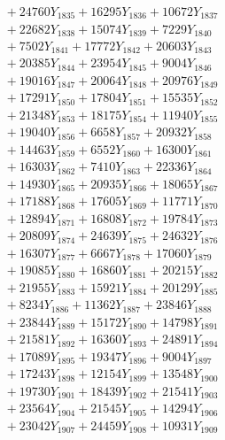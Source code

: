 \documentclass[a4paper,10pt]{article}
\begin{document}
{\begin{align}
&\;  + 24760 Y_{1835} + 16295 Y_{1836} + 10672 Y_{1837} \\[0.3ex]
&\;  + 22682 Y_{1838} + 15074 Y_{1839} + 7229 Y_{1840} \\[0.3ex]
&\;  + 7502 Y_{1841} + 17772 Y_{1842} + 20603 Y_{1843} \\[0.3ex]
&\;  + 20385 Y_{1844} + 23954 Y_{1845} + 9004 Y_{1846} \\[0.3ex]
&\;  + 19016 Y_{1847} + 20064 Y_{1848} + 20976 Y_{1849} \\[0.3ex]
&\;  + 17291 Y_{1850} + 17804 Y_{1851} + 15535 Y_{1852} \\[0.3ex]
&\;  + 21348 Y_{1853} + 18175 Y_{1854} + 11940 Y_{1855} \\[0.3ex]
&\;  + 19040 Y_{1856} + 6658 Y_{1857} + 20932 Y_{1858} \\[0.5ex]\allowbreak
&\;  + 14463 Y_{1859} + 6552 Y_{1860} + 16300 Y_{1861} \\[0.3ex]
&\;  + 16303 Y_{1862} + 7410 Y_{1863} + 22336 Y_{1864} \\[0.3ex]
&\;  + 14930 Y_{1865} + 20935 Y_{1866} + 18065 Y_{1867} \\[0.3ex]
&\;  + 17188 Y_{1868} + 17605 Y_{1869} + 11771 Y_{1870} \\[0.3ex]
&\;  + 12894 Y_{1871} + 16808 Y_{1872} + 19784 Y_{1873} \\[0.3ex]
&\;  + 20809 Y_{1874} + 24639 Y_{1875} + 24632 Y_{1876} \\[0.3ex]
&\;  + 16307 Y_{1877} + 6667 Y_{1878} + 17060 Y_{1879} \\[0.3ex]
&\;  + 19085 Y_{1880} + 16860 Y_{1881} + 20215 Y_{1882} \\[0.3ex]
&\;  + 21955 Y_{1883} + 15921 Y_{1884} + 20129 Y_{1885} \\[0.3ex]
&\;  + 8234 Y_{1886} + 11362 Y_{1887} + 23846 Y_{1888} \\[0.5ex]\allowbreak
&\;  + 23844 Y_{1889} + 15172 Y_{1890} + 14798 Y_{1891} \\[0.3ex]
&\;  + 21581 Y_{1892} + 16360 Y_{1893} + 24891 Y_{1894} \\[0.3ex]
&\;  + 17089 Y_{1895} + 19347 Y_{1896} + 9004 Y_{1897} \\[0.3ex]
&\;  + 17243 Y_{1898} + 12154 Y_{1899} + 13548 Y_{1900} \\[0.3ex]
&\;  + 19730 Y_{1901} + 18439 Y_{1902} + 21541 Y_{1903} \\[0.3ex]
&\;  + 23564 Y_{1904} + 21545 Y_{1905} + 14294 Y_{1906} \\[0.3ex]
&\;  + 23042 Y_{1907} + 24459 Y_{1908} + 10931 Y_{1909} \\[0.3ex]

\end{align}}
\end{document}
